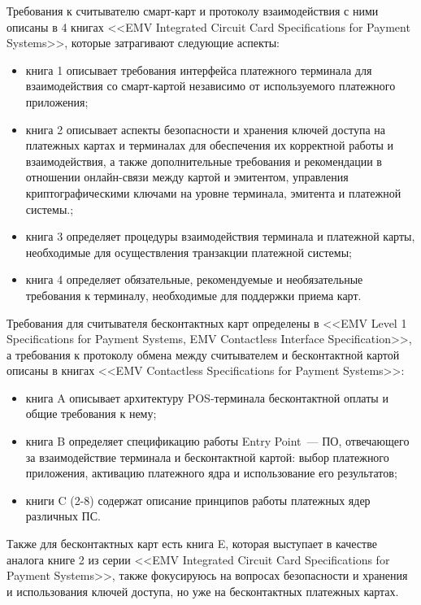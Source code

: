 Требования к считывателю смарт-карт и протоколу взаимодействия с ними описаны в 4 книгах <<EMV Integrated Circuit Card Specifications for Payment Systems>>, которые затрагивают следующие аспекты:
\begin{itemize}
    \item книга 1 описывает требования интерфейса платежного терминала для взаимодействия со смарт-картой независимо от используемого платежного приложения;
    \item книга 2 описывает аспекты безопасности и хранения ключей доступа на платежных картах и терминалах для обеспечения их корректной работы и взаимодействия, а также дополнительные требования и рекомендации в отношении онлайн-связи между картой и эмитентом, управления
    криптографическими ключами на уровне терминала, эмитента и платежной системы.;
    \item книга 3 определяет процедуры взаимодействия терминала и платежной карты, необходимые для осуществления транзакции платежной системы;
    \item книга 4 определяет обязательные, рекомендуемые и необязательные требования к терминалу, необходимые для поддержки приема карт.
\end{itemize}

Требования для считывателя бесконтактных карт определены в <<EMV Level 1 Specifications for Payment Systems, EMV Contactless Interface Specification>>, а требования к протоколу обмена между считывателем и бесконтактной картой описаны в книгах <<EMV Contactless Specifications for Payment Systems>>:
\begin{itemize}
    \item книга A описывает архитектуру POS-терминала бесконтактной оплаты и общие требования к нему;
    \item книга B определяет спецификацию работы Entry Point~--- ПО, отвечающего за взаимодействие терминала и бесконтактной картой: выбор платежного приложения, активацию платежного ядра и использование его результатов;
    \item книги C (2-8) содержат описание принципов работы платежных ядер различных ПС.
\end{itemize}

Также для бесконтактных карт есть книга E, которая выступает в качестве аналога книге 2 из серии <<EMV Integrated Circuit Card Specifications for Payment Systems>>, также фокусируюсь на вопросах безопасности и хранения и использования ключей доступа, но уже на бесконтактных платежных картах.

